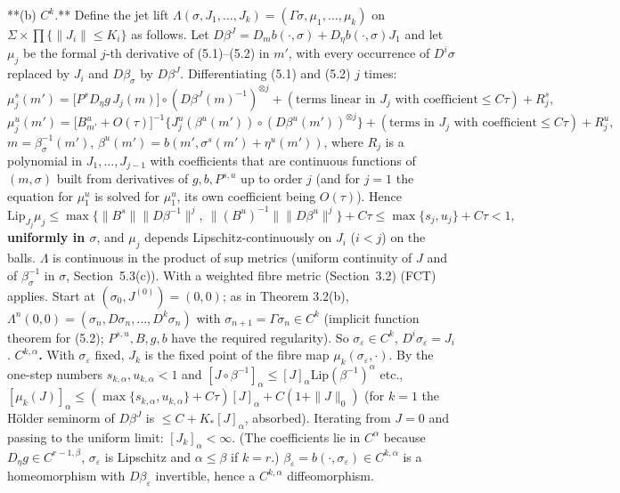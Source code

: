 \documentclass[11pt,a4paper]{article}
\theoremstyle{plain}
\theoremstyle{definition}
\theoremstyle{remark}
\numberwithin{equation}{section}
\numberwithin{figure}{section}
\begin{document}
**(b) $C^k$.** Define the jet lift $\Lambda(\sigma,J_1,\dots,J_k)=(\Gamma\sigma,\mu_1,\dots,\mu_k)$ on $\Sigma\times\prod\{\|J_i\|\le K_i\}$ as follows. Let $D\beta^J=D_mb(\cdot,\sigma)+D_\eta b(\cdot,\sigma)J_1$ and let $\mu_j$ be the formal $j$-th derivative of (5.1)–(5.2) in $m'$, with every occurrence of $D^i\sigma$ replaced by $J_i$ and $D\beta_\sigma$ by $D\beta^J$. Differentiating (5.1) and (5.2) $j$ times:
\[
\mu^s_j(m')=\big[P^sD_\eta g\,J_j(m)\big]\circ(D\beta^{J}(m)^{-1})^{\otimes j}+(\text{terms linear in }J_j\text{ with coefficient}\le C\tau)+R^s_j,
\]
\[
\mu^u_j(m')=\big[B^u_{m'}+O(\tau)\big]^{-1}\Big\{J_j^u(\beta^u(m'))\circ(D\beta^u(m'))^{\otimes j}\Big\}
+(\text{terms in }J_j\text{ with coefficient}\le C\tau)+R^u_j,
\]
$m=\beta_\sigma^{-1}(m')$, $\beta^u(m')=b(m',\sigma^s(m')+\eta^u(m'))$, where $R_j$ is a polynomial in $J_1,\dots,J_{j-1}$ with coefficients that are continuous functions of $(m,\sigma)$ built from derivatives of $g,b,P^{s,u}$ up to order $j$ (and for $j=1$ the equation for $\mu^u_1$ is solved for $\mu^u_1$, its own coefficient being $O(\tau)$). Hence
\[
\mathrm{Lip}_{J_j}\mu_j\le\max\{\|B^s\|\|D\beta^{-1}\|^j,\ \|(B^u)^{-1}\|\|D\beta^u\|^j\}+C\tau\le\max\{s_j,u_j\}+C\tau<1,
\]
\textbf{uniformly in $\sigma$}, and $\mu_j$ depends Lipschitz-continuously on $J_i$ ($i<j$) on the balls. $\Lambda$ is continuous in the product of sup metrics (uniform continuity of $J$ and of $\beta_\sigma^{-1}$ in $\sigma$, Section~5.3(c)). With a weighted fibre metric (Section~3.2) (FCT) applies. Start at $(\sigma_0,J^{(0)})=(0,0)$; as in Theorem 3.2(b), $\Lambda^n(0,0)=(\sigma_n,D\sigma_n,\dots,D^k\sigma_n)$ with $\sigma_{n+1}=\Gamma\sigma_n\in C^{k}$ (implicit function theorem for (5.2); $P^{s,u},B,g,b$ have the required regularity). So $\sigma_\varepsilon\in C^k$, $D^i\sigma_\varepsilon=J_i$.
\textbf{$C^{k,\alpha}$.} With $\sigma_\varepsilon$ fixed, $J_k$ is the fixed point of the fibre map $\mu_k(\sigma_\varepsilon,\cdot)$. By the one-step numbers $s_{k,\alpha},u_{k,\alpha}<1$ and $[J\circ\beta^{-1}]_\alpha\le[J]_\alpha\mathrm{Lip}(\beta^{-1})^\alpha$ etc., $[\mu_k(J)]_\alpha\le(\max\{s_{k,\alpha},u_{k,\alpha}\}+C\tau)[J]_\alpha+C(1+\|J\|_0)$ (for $k=1$ the Hölder seminorm of $D\beta^J$ is $\le C+K_*[J]_\alpha$, absorbed). Iterating from $J=0$ and passing to the uniform limit: $[J_k]_\alpha<\infty$. (The coefficients lie in $C^\alpha$ because $D_\eta g\in C^{r-1,\beta}$, $\sigma_\varepsilon$ is Lipschitz and $\alpha\le\beta$ if $k=r$.) $\beta_\varepsilon=b(\cdot,\sigma_\varepsilon)\in C^{k,\alpha}$ is a homeomorphism with $D\beta_\varepsilon$ invertible, hence a $C^{k,\alpha}$ diffeomorphism.
\end{document}
